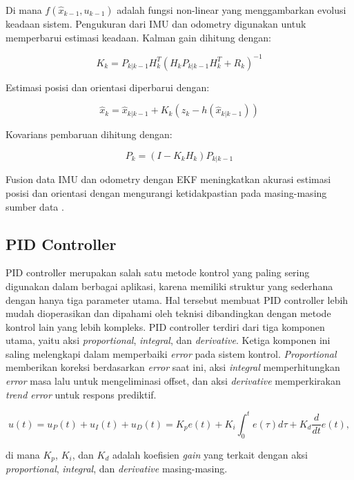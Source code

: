 Di mana \( f(\hat{x}_{k-1}, u_{k-1}) \) adalah fungsi non-linear yang menggambarkan evolusi keadaan sistem. Pengukuran dari IMU dan odometry digunakan untuk memperbarui estimasi keadaan. Kalman gain dihitung dengan:

\begin{equation}
K_k = P_{k|k-1} H_k^T \left( H_k P_{k|k-1} H_k^T + R_k \right)^{-1}
\end{equation}

Estimasi posisi dan orientasi diperbarui dengan:

\begin{equation}
\hat{x}_k = \hat{x}_{k|k-1} + K_k \left( z_k - h(\hat{x}_{k|k-1}) \right)
\end{equation}

Kovarians pembaruan dihitung dengan:

\begin{equation}
P_k = (I - K_k H_k) P_{k|k-1}
\end{equation}

Fusion data IMU dan odometry dengan EKF meningkatkan akurasi estimasi posisi dan orientasi dengan mengurangi ketidakpastian pada masing-masing sumber data \cite{barbosa2016}.


\subsection{PID Controller}
PID controller merupakan salah satu metode kontrol yang paling sering digunakan dalam berbagai aplikasi, karena memiliki struktur yang sederhana dengan hanya tiga parameter utama. Hal tersebut membuat PID controller lebih mudah dioperasikan dan dipahami oleh teknisi dibandingkan dengan metode kontrol lain yang lebih kompleks. PID controller terdiri dari tiga komponen utama, yaitu aksi \emph{proportional}, \emph{integral}, dan \emph{derivative}. Ketiga komponen ini saling melengkapi dalam memperbaiki \emph{error} pada sistem kontrol. \emph{Proportional} memberikan koreksi berdasarkan \emph{error} saat ini, aksi \emph{integral} memperhitungkan \emph{error} masa lalu untuk mengeliminasi offset, dan aksi \emph{derivative} memperkirakan \emph{trend error} untuk respons prediktif. 

\begin{equation}
    u(t) = u_P(t) + u_I(t) + u_D(t) = K_p e(t) + K_i \int_{0}^{t} e(\tau) d\tau + K_d \frac{d}{dt}e(t),
\end{equation}

di mana $K_p$, $K_i$, dan $K_d$ adalah koefisien \emph{gain} yang terkait dengan aksi \emph{proportional}, \emph{integral}, dan \emph{derivative} masing-masing.

